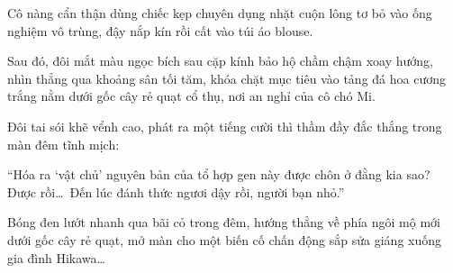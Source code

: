 \documentclass[../main.tex]{subfiles}
\begin{document}
Cô nàng cẩn thận dùng chiếc kẹp chuyên dụng nhặt cuộn lông tơ bỏ vào ống nghiệm vô trùng, đậy nắp kín rồi cất vào túi áo blouse.

Sau đó, đôi mắt màu ngọc bích sau cặp kính bảo hộ chầm chậm xoay hướng, nhìn thẳng qua khoảng sân tối tăm, khóa chặt mục tiêu vào tảng đá hoa cương trắng nằm dưới gốc cây rẻ quạt cổ thụ, nơi an nghỉ của cô chó Mi.

Đôi tai sói khẽ vểnh cao, phát ra một tiếng cười thì thầm đầy đắc thắng trong màn đêm tĩnh mịch:

``Hóa ra `vật chủ' nguyên bản của tổ hợp gen này được chôn ở đằng kia sao? Được rồi\dots\ Đến lúc đánh thức ngươi dậy rồi, người bạn nhỏ.''

Bóng đen lướt nhanh qua bãi cỏ trong đêm, hướng thẳng về phía ngôi mộ mới dưới gốc cây rẻ quạt, mở màn cho một biến cố chấn động sắp sửa giáng xuống gia đình Hikawa\dots
\end{document}
